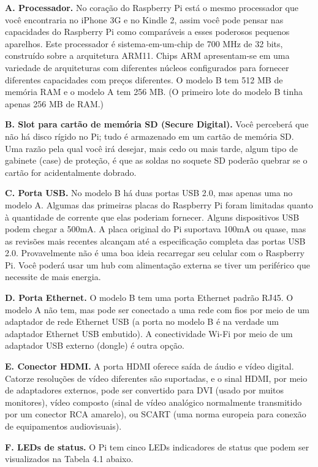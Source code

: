 \textbf{A. Processador.} No coração do Raspberry Pi está o mesmo processador que você encontraria no iPhone 3G e no Kindle 2, assim você pode pensar nas capacidades do Raspberry Pi como comparáveis a esses poderosos pequenos aparelhos. Este processador é sistema-em-um-chip de 700 MHz de 32 bits, construído sobre a arquitetura ARM11. Chips ARM apresentam-se em uma variedade de arquiteturas com diferentes núcleos configurados para fornecer diferentes capacidades com preços diferentes. O modelo B tem 512 MB de memória RAM e o modelo A tem 256 MB. (O primeiro lote do modelo B tinha apenas 256 MB de RAM.)
    
\textbf{B. Slot para cartão de memória SD (Secure Digital).} Você perceberá que não há disco rígido no Pi; tudo é armazenado em um cartão de memória SD. Uma razão pela qual você irá desejar, mais cedo ou mais tarde, algum tipo de gabinete (case) de proteção, é que as soldas no soquete SD poderão quebrar se o cartão for acidentalmente dobrado.

\textbf{C. Porta USB.} No modelo B há duas portas USB 2.0, mas apenas uma no modelo A. Algumas das primeiras placas do Raspberry Pi foram limitadas quanto à quantidade de corrente que elas poderiam fornecer. Alguns dispositivos USB podem chegar a 500mA. A placa original do Pi suportava 100mA ou quase, mas as revisões mais recentes alcançam até a especificação completa das portas USB 2.0. Provavelmente não é uma boa ideia recarregar seu celular com o Raspberry Pi. Você poderá usar um hub com alimentação externa se tiver um periférico que necessite de mais energia.

\textbf{D. Porta Ethernet.} O modelo B tem uma porta Ethernet padrão RJ45. O modelo A não tem, mas pode ser conectado a uma rede com fios por meio de um adaptador de rede Ethernet USB (a porta no modelo B é na verdade um adaptador Ethernet USB embutido). A conectividade Wi-Fi por meio de um adaptador USB externo (dongle) é outra opção.

\textbf{E. Conector HDMI.} A porta HDMI oferece saída de áudio e vídeo digital. Catorze resoluções de vídeo diferentes são suportadas, e o sinal HDMI, por meio de adaptadores externos, pode ser convertido para DVI (usado por muitos monitores), vídeo composto (sinal de vídeo analógico normalmente transmitido por um conector RCA amarelo), ou SCART (uma norma europeia para conexão de equipamentos audiovisuais).

\textbf{F. LEDs de status.} O Pi tem cinco LEDs indicadores de status que podem ser visualizados na Tabela 4.1 abaixo.

